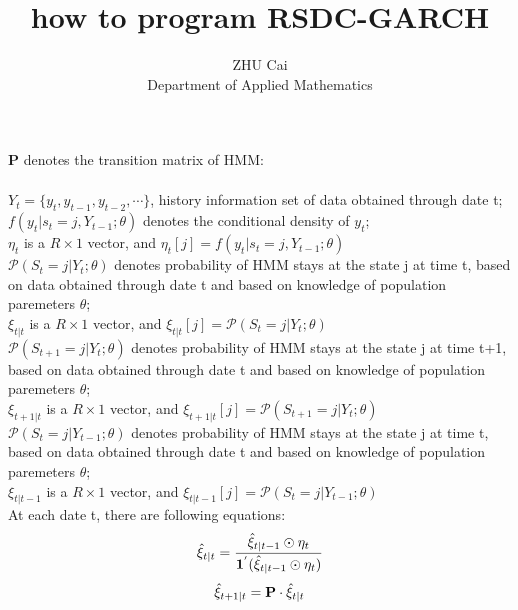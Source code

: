 \documentclass[a4paper,12pt]{article}
\title{how to program RSDC-GARCH}
\author{ZHU Cai\\ Department of Applied Mathematics}
\begin{document}
\maketitle
\noindent\textbf{P} denotes the transition matrix of HMM:
\[
\begin{array}{ccc}

\end{array}
\]

\noindent $Y_t=\{y_t, y_{t-1}, y_{t-2}, \cdots\}$, history information set of data obtained through date t;\\

\noindent $f(y_t|s_t=j,Y_{t-1};\theta)$ denotes the conditional density of $y_t$;\\
\noindent $\eta_t$ is a $R\times1$ vector, and $\eta_t[j]= f(y_t|s_t=j,Y_{t-1};\theta)$\\

\noindent $\mathcal{P}(S_t=j|Y_t;\theta)$ denotes probability of HMM stays at the state j at time t, based on data
obtained through date t and based on knowledge of population paremeters $\theta$;\\
\noindent $\xi_{t|t}$ is a $R\times1$ vector, and $\xi_{t|t}[j]=\mathcal{P}(S_t=j|Y_t;\theta)$\\

\noindent $\mathcal{P}(S_{t+1}=j|Y_t;\theta)$ denotes probability of HMM stays at the state j at time t+1, based on data obtained through date t and based on knowledge of population paremeters $\theta$;\\
\noindent $\xi_{t+1|t}$ is a $R\times1$ vector, and $\xi_{t+1|t}[j]=\mathcal{P}(S_{t+1}=j|Y_t;\theta)$\\

\noindent $\mathcal{P}(S_t=j|Y_{t-1};\theta)$ denotes probability of HMM stays at the state j at time t, based on data obtained through date t and based on knowledge of population paremeters $\theta$;\\
\noindent $\xi_{t|t-1}$ is a $R\times1$ vector, and $\xi_{t|t-1}[j]=\mathcal{P}(S_t=j|Y_{t-1};\theta)$\\

\noindent At each date t, there are following equations:\\
\begin{equation}
\centering
\hat{\xi}_{t|t}=\frac{\hat{\xi}_{t|t-1}\odot\eta_t}{\textbf{1}^{'}(\hat{\xi}_{t|t-1}\odot\eta_t)}
\end{equation}
\begin{equation}
\centering
\hat{\xi}_{t+1|t}=\textbf{P}\cdot\hat{\xi}_{t|t}
\end{equation}
\end{document}

